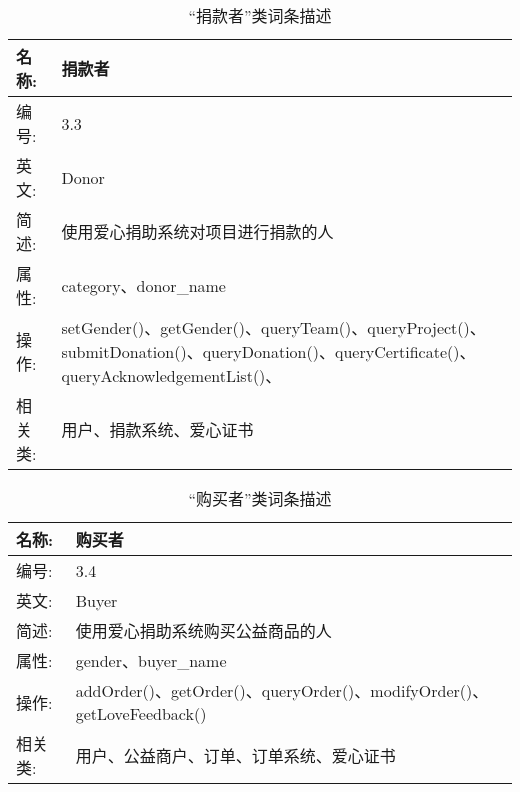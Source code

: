 \begin{table}[H]  
\caption{“捐款者”类词条描述}  
\begin{center}  
    \begin{tabular}{l p{11cm}} 
        \hline
        \quad 名称:  &  捐款者 \\
        \hline
        \quad 编号:  & 3.3 \\
        \hline
        \quad 英文:  &  Donor \\
        \hline
        \quad 简述:  & 使用爱心捐助系统对项目进行捐款的人 \\
        \hline
        \quad 属性:  & category、donor\_name\\
        \hline
        \quad 操作:  & setGender()、getGender()、queryTeam()、queryProject()、submitDonation()、queryDonation()、queryCertificate()、queryAcknowledgementList()、\\
        \hline
        \quad 相关类:  & 用户、捐款系统、爱心证书 \\
        \hline
    \end{tabular}
\end{center}
\end{table}

\begin{table}[H]  
\caption{“购买者”类词条描述}  
\begin{center}  
    \begin{tabular}{l p{11cm}} 
        \hline
        \quad 名称:  & 购买者 \\
        \hline
        \quad 编号:  & 3.4 \\
        \hline
        \quad 英文:  &  Buyer \\
        \hline
        \quad 简述:  & 使用爱心捐助系统购买公益商品的人 \\
        \hline
        \quad 属性:  & gender、buyer\_name \\
        \hline
        \quad 操作:  & addOrder()、getOrder()、queryOrder()、modifyOrder()、getLoveFeedback() \\
        \hline
        \quad 相关类:  & 用户、公益商户、订单、订单系统、爱心证书 \\
        \hline
    \end{tabular}
\end{center}
\end{table}


